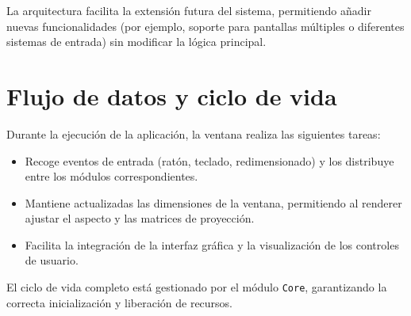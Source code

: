 La arquitectura facilita la extensión futura del sistema, permitiendo añadir
nuevas funcionalidades (por ejemplo, soporte para pantallas múltiples o
diferentes sistemas de entrada) sin modificar la lógica principal.

\section{Flujo de datos y ciclo de vida}

Durante la ejecución de la aplicación, la ventana realiza las siguientes
tareas:

\begin{itemize}
    \item Recoge eventos de entrada (ratón, teclado, redimensionado) y los distribuye
          entre los módulos correspondientes.
    \item Mantiene actualizadas las dimensiones de la ventana, permitiendo al renderer
          ajustar el aspecto y las matrices de proyección.
    \item Facilita la integración de la interfaz gráfica y la visualización de los
          controles de usuario.
\end{itemize}

El ciclo de vida completo está gestionado por el módulo \texttt{Core},
garantizando la correcta inicialización y liberación de recursos.
